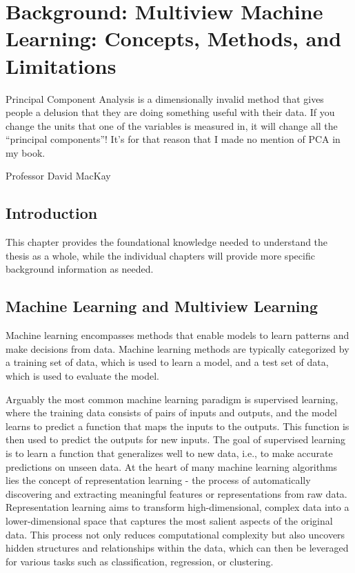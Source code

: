 \graphicspath{{chapters/background/}}


\chapter{Background: Multiview Machine Learning: Concepts, Methods, and Limitations}\label{ch:background}
 \epigraph{Principal Component Analysis is a dimensionally invalid method that gives people a delusion that they are doing something useful with their data. If you change the units that one of the variables is measured in, it will change all the “principal components”! It’s for that reason that I made no mention of PCA in my book.}{Professor David MacKay}
\minitoc

\section{Introduction}

This chapter provides the foundational knowledge needed to understand the thesis as a whole, while the individual chapters will provide more specific background information as needed.

\section{Machine Learning and Multiview Learning}

Machine learning encompasses methods that enable models to learn patterns and make decisions from data. Machine learning methods are typically categorized by a training set of data, which is used to learn a model, and a test set of data, which is used to evaluate the model.

Arguably the most common machine learning paradigm is supervised learning, where the training data consists of pairs of inputs and outputs, and the model learns to predict a function that maps the inputs to the outputs. This function is then used to predict the outputs for new inputs. The goal of supervised learning is to learn a function that generalizes well to new data, i.e., to make accurate predictions on unseen data.
At the heart of many machine learning algorithms lies the concept of representation learning - the process of automatically discovering and extracting meaningful features or \gls{representations} from raw data. Representation learning aims to transform high-dimensional, complex data into a lower-dimensional space that captures the most salient aspects of the original data. This process not only reduces computational complexity but also uncovers hidden structures and relationships within the data, which can then be leveraged for various tasks such as classification, regression, or clustering.

